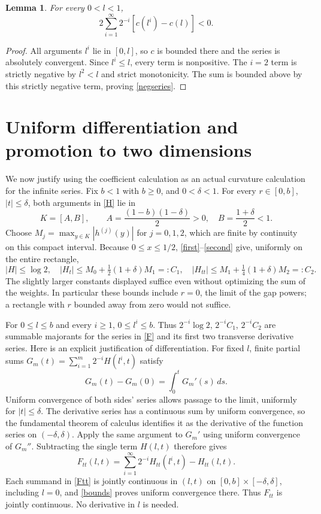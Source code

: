 \documentclass[11pt]{article}
\newtheorem{lemma}[theorem]{Lemma}
\begin{document}
\begin{lemma}\label{negative}
For every $0<l<1$,
\begin{equation}
 2\sum_{i=1}^{\infty}2^{-i}[c(l^i)-c(l)]<0.\label{negseries}
\end{equation}
\end{lemma}
\begin{proof}
All arguments $l^i$ lie in $[0,l]$, so $c$ is bounded there and the series is absolutely convergent. Since $l^i\leq l$, every term is nonpositive. The $i=2$ term is strictly negative by $l^2<l$ and strict monotonicity. The sum is bounded above by this strictly negative term, proving \eqref{negseries}.
\end{proof}

\section{Uniform differentiation and promotion to two dimensions}
We now justify using the coefficient calculation as an actual curvature calculation for the infinite series. Fix $b<1$ with $b\geq0$, and $0<\delta<1$. For every $r\in[0,b]$, $|t|\leq\delta$, both arguments in \eqref{H} lie in
\begin{equation}
 K=[A,B],\qquad A=\frac{(1-b)(1-\delta)}2>0,
 \quad B=\frac{1+\delta}2<1.\label{compactK}
\end{equation}
Choose $M_j=\max_{y\in K}|h^{(j)}(y)|$ for $j=0,1,2$, which are finite by continuity on this compact interval. Because $0\leq x\leq1/2$, \eqref{first}--\eqref{second} give, uniformly on the entire rectangle,
\begin{equation}
 |H|\leq\log2,\quad
 |H_t|\leq M_0+\tfrac12(1+\delta)M_1=:C_1,\quad
 |H_{tt}|\leq M_1+\tfrac14(1+\delta)M_2=:C_2.\label{bounds}
\end{equation}
The slightly larger constants displayed suffice even without optimizing the sum of the weights. In particular these bounds include $r=0$, the limit of the gap powers; a rectangle with $r$ bounded away from zero would not suffice.

For $0\leq l\leq b$ and every $i\geq1$, $0\leq l^i\leq b$. Thus $2^{-i}\log2$, $2^{-i}C_1$, $2^{-i}C_2$ are summable majorants for the series in \eqref{F} and its first two transverse derivative series. Here is an explicit justification of differentiation. For fixed $l$, finite partial sums $G_m(t)=\sum_{i=1}^m2^{-i}H(l^i,t)$ satisfy
\[
 G_m(t)-G_m(0)=\int_0^t G_m'(s)\,ds.
\]
Uniform convergence of both sides' series allows passage to the limit, uniformly for $|t|\leq\delta$. The derivative series has a continuous sum by uniform convergence, so the fundamental theorem of calculus identifies it as the derivative of the function series on $(-\delta,\delta)$. Apply the same argument to $G_m'$ using uniform convergence of $G_m''$. Subtracting the single term $H(l,t)$ therefore gives
\begin{equation}
 F_{tt}(l,t)=\sum_{i=1}^{\infty}2^{-i}H_{tt}(l^i,t)-H_{tt}(l,t).\label{Ftt}
\end{equation}
Each summand in \eqref{Ftt} is jointly continuous in $(l,t)$ on $[0,b]\times[-\delta,\delta]$, including $l=0$, and \eqref{bounds} proves uniform convergence there. Thus $F_{tt}$ is jointly continuous. No derivative in $l$ is needed.
\end{document}
